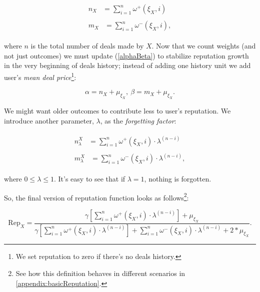 \documentclass[11pt]{article}
\begin{document}
\begin{align}
\begin{split}
n_{X} {} & = \sum_{i = 1}^{n} \omega^{+}(\xi_X, i)
\end{split} \\
\begin{split}
m_{X} {}& = \sum_{i = 1}^{n} \omega^{-}(\xi_X, i), 
\end{split}
\end{align}

where $ n $ is the total number of deals made by $ X $. Now that we count weights (and not just outcomes) we must update (\ref{alphaBeta}) to stabilize reputation growth in the very beginning of deals history; instead of adding one history unit we add user's \textit{mean deal price}\footnote{We set reputation to zero if there's no deals history.}:

\begin{equation} \label{alphaBetaRefined}
\alpha = n_{X} + \mu_{\xi_X},\ \beta = m_{X} + \mu_{\xi_X}.
\end{equation}

We might want older outcomes to contribute less to user's reputation. We introduce another parameter, $ \lambda $, as the \textit{forgetting factor}:

\begin{align}
\begin{split}
n_{\lambda}^{X} {}& = \sum_{i = 1}^{n} \omega^{+}(\xi_X, i) \cdot \lambda^{(n - i)}
\end{split} \\
\begin{split}
m_{\lambda}^{X} {}& = \sum_{i = 1}^{n} \omega^{-}(\xi_X, i) \cdot \lambda^{(n - i)},
\end{split}
\end{align}

where $ 0 \leq \lambda \leq 1 $. It's easy to see that if $ \lambda = 1 $, nothing is forgotten.

So, the final version of reputation function looks as follows\footnote{See how this definition behaves in different scenarios in \ref{appendix:basicReputation}.}:

\begin{equation} \label{reputationFunctionRefined}
\text{Rep}_{X} = \frac{\gamma[\sum_{i = 1}^{n} \omega^{+}(\xi_X, i) \cdot \lambda^{(n - i)}] + \mu_{\xi_X}}{\gamma[\sum_{i = 1}^{n} \omega^{+}(\xi_X, i) \cdot \lambda^{(n - i)}] + \sum_{i = 1}^{n} \omega^{-}(\xi_X, i) \cdot \lambda^{(n - i)} + 2 * \mu_{\xi_X}}.
\end{equation}
\end{document}
